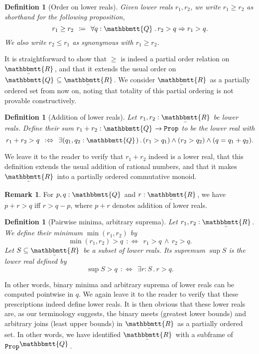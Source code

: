 \documentclass[reqno,11pt]{amsproc}
\theoremstyle{plain}
\newtheorem{definition}[theorem]{Definition}
\theoremstyle{definition}
\newtheorem{remark}[theorem]{Remark}
\newcommand{\Const}[1]{\mathtt{#1}}
\renewcommand{\to}[1][]{\xrightarrow{#1}}
\newcommand{\ubar}[1]{\underaccent{\bar}{#1}}
\newcommand{\internal}[1]{\raisebox{-.03ex}{$\mathbbmtt{#1}$}}
\newcommand{\hs}{\hspace{1pt}}
\newcommand{\tqq}{\internal{Q}\hs}
\newcommand{\trr}{\internal{R}}
\newcommand{\tlrr}{\ubar{\trr}\hs}
\newcommand{\prop}{\Const{Prop}}
\newcommand{\imp}{\Rightarrow}
\renewcommand{\iff}{\Leftrightarrow}
\numberwithin{equation}{section}
\begin{document}
\begin{definition}[Order on lower reals]
Given lower reals $r_1,r_2$,
we write $r_1 \geq r_2$ as shorthand for the following proposition,
\begin{equation}\label{eqn.real_order}
	r_1 \geq r_2 \:\:\coloneqq\:\: \forall q:\tqq \, . \, r_2 > q \imp r_1 > q.
\end{equation}
We also write $r_2 \leq r_1$ as synonymous with $r_1 \geq r_2$.
\end{definition}

It is straightforward to show that $\geq$ is indeed a partial order relation on $\tlrr$, and that it extends the usual order on $\tqq \subseteq \tlrr$. We consider $\tlrr$ as a partially ordered set from now on, noting that totality of this partial ordering is not provable constructively.

\begin{definition}[Addition of lower reals]\label{def.sum_lr}
Let $r_1,r_2:\tlrr$ be lower reals. Define their \emph{sum} $r_1 + r_2 : \tqq\to\prop$ to be the lower real with
\begin{equation}\label{eqn.sum_lr}
r_1+r_2 > q \:\::\iff\:\: \exists (q_1,q_2:\tqq) \,.\, (r_1>q_1)\wedge (r_2> q_2)\wedge (q=q_1+q_2).
\end{equation}
\end{definition}

We leave it to the reader to verify that $r_1 + r_2$ indeed is a lower real, that this definition extends the usual addition of rational numbers, and that it makes $\tlrr$ into a partially ordered commutative monoid.

\begin{remark}
	\label{rational_ineq_move}
	For $p,q : \tqq$ and $r : \tlrr$, we have $p + r > q$ iff $r > q - p$, where $p + r$ denotes addition of lower reals.
\end{remark}

\begin{definition}[Pairwise minima, arbitrary suprema]\label{def.min_sup}
Let $r_1,r_2:\tlrr$. We define their \emph{minimum} $\min(r_1,r_2)$ by
\[
	\min(r_1, r_2) > q \:\::\iff\:\: r_1 > q \,\wedge\, r_2 > q.
\]
Let $S \subseteq \tlrr$ be a subset of lower reals.
Its \emph{supremum} $\sup S$ is the lower real defined  by 
\[
	\sup S > q \:\::\iff\:\: \exists r : S \,.\, r > q.
\]
\end{definition}

In other words, binary minima and arbitrary suprema of lower reals can be computed pointwise in $q$. We again leave it to the reader to verify that these prescriptions indeed define lower reals. It is then obvious that these lower reals are, as our terminology suggests, the binary meets (greatest lower bounds) and arbitrary joins (least upper bounds) in $\tlrr$ as a partially ordered set. In other words, we have identified $\tlrr$ with a subframe of $\prop^{\tqq}$.
\end{document}

